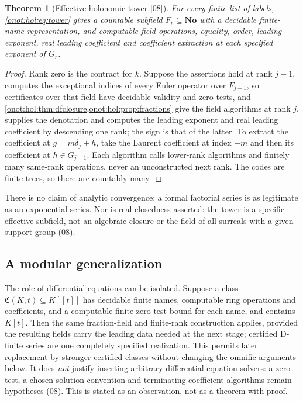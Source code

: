 \documentclass[11pt,oneside]{article}
\numberwithin{equation}{section}
\newtheorem{theorem}{Theorem}[section]
\theoremstyle{definition}
\theoremstyle{remark}
\newcommand{\No}{\mathbf{No}}
\newcommand{\src}[1]{\textup{\textsf{\small[#1]}}}
\begin{document}
\begin{theorem}[Effective holonomic tower \src{08}]\label{onot:hol:thm:tower}
For every finite list of labels, \eqref{onot:hol:eq:tower} gives a countable
subfield $F_r\subseteq\No$ with a decidable finite-name representation, and
computable field operations, equality, order, leading exponent, real leading
coefficient and coefficient extraction at each specified exponent of $G_r$.
\end{theorem}
\begin{proof}
Rank zero is the contract for $k$. Suppose the assertions hold at rank $j-1$.
 computes the exceptional indices of every Euler
operator over $F_{j-1}$, so certificates over that field have decidable validity
and zero tests, and \cref{onot:hol:thm:dfclosure,onot:hol:prop:fractions} give
the field algorithms at rank $j$.  supplies the
denotation and computes the leading exponent and real leading coefficient by
descending one rank; the sign is that of the latter. To extract the coefficient
at $g=m\delta_j+h$, take the Laurent coefficient at index $-m$ and then its
coefficient at $h\in G_{j-1}$. Each algorithm calls lower-rank algorithms and
finitely many same-rank operations, never an unconstructed next rank. The codes
are finite trees, so there are countably many.
\end{proof}

There is no claim of analytic convergence: a formal factorial series is as
legitimate as an exponential series. Nor is real closedness asserted: the tower
is a specific effective subfield, not an algebraic closure or the field of all
surreals with a given support group (08).

\subsection{A modular generalization}

The role of differential equations can be isolated. Suppose a class
$\mathfrak C(K,t)\subseteq K[[t]]$ has decidable finite names, computable ring
operations and coefficients, and a computable finite zero-test bound for each
name, and contains $K[t]$. Then the same fraction-field and finite-rank
construction applies, provided the resulting fields carry the leading data needed
at the next stage; certified D-finite series are one completely specified
realization. This permits later replacement by stronger certified classes without
changing the omnific arguments below. It does \emph{not} justify inserting
arbitrary differential-equation solvers: a zero test, a chosen-solution
convention and terminating coefficient algorithms remain hypotheses (08). This is
stated as an observation, not as a theorem with proof.
\end{document}
